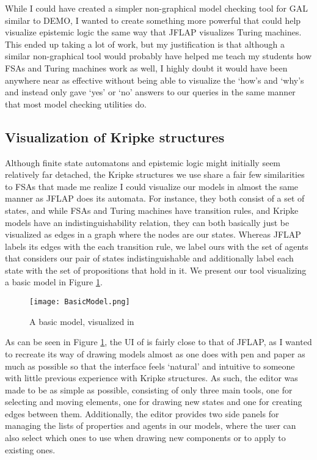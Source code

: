 While I could have created a simpler non-graphical model checking tool for GAL similar to DEMO, I wanted to create something more powerful that could help visualize epistemic logic the same way that JFLAP visualizes Turing machines. This ended up taking a lot of work, but my justification is that although a similar non-graphical tool would probably have helped me teach my students how FSAs and Turing machines work as well, I highly doubt it would have been anywhere near as effective without being able to visualize the `how's and `why's and instead only gave `yes' or `no' answers to our queries in the same manner that most model checking utilities do. 

\subsection{Visualization of Kripke structures}
Although finite state automatons and epistemic logic might initially seem relatively far detached, the Kripke structures we use share a fair few similarities to FSAs that made me realize I could visualize our models in almost the same manner as JFLAP does its automata. For instance, they both consist of a set of states, and while FSAs and Turing machines have transition rules, and Kripke models have an indistinguishability relation, they can both basically just be visualized as edges in a graph where the nodes are our states. Whereas JFLAP labels its edges with the each transition rule, we label ours with the set of agents that considers our pair of states indistinguishable and additionally label each state with the set of propositions that hold in it. We present our tool visualizing a basic model in Figure \ref{fig:basicModelVis}.


\begin{figure}[H]
	\label{fig:basicModelVis}
	\caption{A basic model, visualized in \cname}
	\texttt{[image: BasicModel.png]}
\end{figure} 

As can be seen in Figure \ref{fig:basicModelVis}, the UI of \cname{} is fairly close to that of JFLAP, as I wanted to recreate its way of drawing models almost as one does with pen and paper as much as possible so that the interface feels `natural' and intuitive to someone with little previous experience with Kripke structures. As such, the editor was made to be as simple as possible, consisting of only three main tools, one for selecting and moving elements, one for drawing new states and one for creating edges between them. Additionally, the editor provides two side panels for managing the lists of properties and agents in our models, where the user can also select which ones to use when drawing new components or to apply to existing ones.

